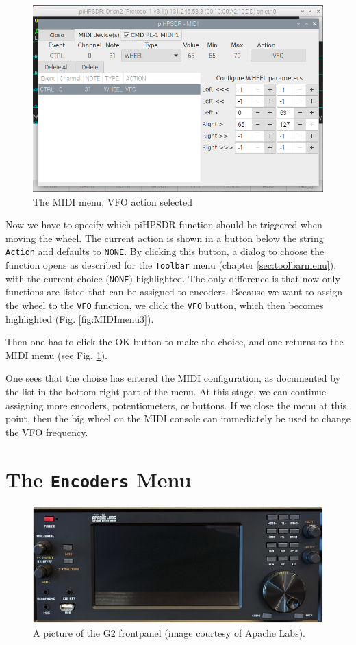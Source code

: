 \documentclass[12pt]{book}
\def\rett#1{\texttt{\color{red}#1}}
\def\bltt#1{\texttt{\color{blue}#1}}
\begin{document}
\begin{figure}[ht!]
\center
\includegraphics[width=12cm]{MIDImenu4.png}
\caption{The MIDI menu, VFO action selected}
\label{fig:MIDImenu4}
\end{figure}
Now we have to specify which piHPSDR function should be triggered when moving the wheel.
The current action is shown in a button below the string \rett{Action} and defaults to \bltt{NONE}.
By clicking this button, a dialog to choose the function opens as described for the
\bltt{Toolbar} menu (chapter \ref{sec:toolbarmenu}), with the current choice (\bltt{NONE})
highlighted. The only difference is that now only functions are listed that can be
assigned to encoders.
Because we want to assign the wheel to the \bltt{VFO} function, we click
the \bltt{VFO} button, which then becomes highlighted (Fig. \ref{fig:MIDImenu3}).



 Then one has to click the OK button to make the choice, and one returns to the
 MIDI menu (see Fig. \ref{fig:MIDImenu4}).
 
One sees that the choise has entered the MIDI configuration, as documented by the
list in the bottom right part of the menu. At this stage, we can continue
assigning more encoders, potentiometers, or buttons. If we close the menu at
this point, then the big wheel on the MIDI console can immediately be used
to change the VFO frequency.

\section{The \texttt{Encoders} Menu}
\begin{figure}[ht!]
\center
\includegraphics[width=12cm]{g2_frontpanel.png}
\caption{A picture of the G2 frontpanel (image courtesy of Apache Labs).}
\label{fig:g2_frontpanel}
\end{figure}
\end{document}
